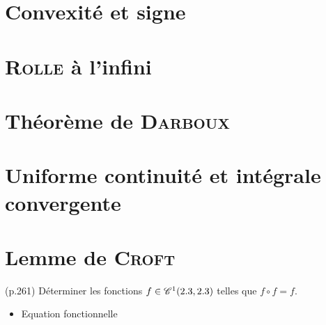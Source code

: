 \section{Convexité et signe}


\section{\textsc{Rolle} à l'infini}


\section{Théorème de \textsc{Darboux}}


\section{Uniforme continuité et intégrale convergente}


\section{Lemme de \textsc{Croft}}


\begin{exercice}
    \cite{exos_oraux} (p.261)
    Déterminer les fonctions $f \in \mathscr{C}^1(2.3, 2.3)$ telles que $f \circ f = f$.
\end{exercice}

\begin{itemize}
    \item Equation fonctionnelle
\end{itemize}